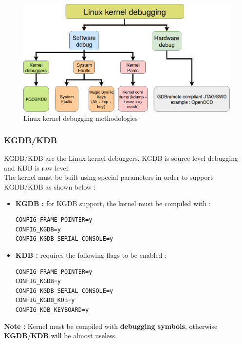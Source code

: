 \begin{figure}[H]
		\centering
        \includegraphics[scale=0.35]{img/solution/kernel-debugging-ways.png}
        \caption{Linux kernel debugging methodologies}
        \label{Linux kernel debugging methodologies}
    \end{figure}


\subsubsection{KGDB/KDB}
KGDB/KDB are the Linux kernel debuggers. KGDB is source level debugging and KDB is raw level.\\

The kernel must be built using special parameters in order to support KGDB/KDB as shown below :
\begin{itemize}
	\item \textbf{KGDB : } for KGDB support, the kernel must be compiled with : 
\begin{lstlisting}[style=BashInputStyle]
CONFIG_FRAME_POINTER=y
CONFIG_KGDB=y
CONFIG_KGDB_SERIAL_CONSOLE=y
\end{lstlisting}


	\item \textbf{KDB : } requires the following flags to be enabled :
\begin{lstlisting}[style=BashInputStyle]	
CONFIG_FRAME_POINTER=y
CONFIG_KGDB=y
CONFIG_KGDB_SERIAL_CONSOLE=y
CONFIG_KGDB_KDB=y
CONFIG_KDB_KEYBOARD=y
\end{lstlisting}	

\end{itemize}

\textbf{\color{orange}Note : } Kernel must be compiled with \textbf{\color{red}debugging symbols}, otherwise \textbf{KGDB}/\textbf{KDB} will be almost useless.


